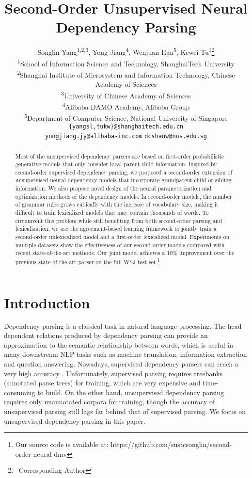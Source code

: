 \documentclass[11pt]{article}
\title{Second-Order Unsupervised Neural Dependency Parsing}
\author{Songlin Yang\textsuperscript{1,2,3}, Yong Jiang\textsuperscript{4}, Wenjuan Han\textsuperscript{5}, Kewei Tu\textsuperscript{1}\thanks{\, 	 Corresponding Author}\\
  \textsuperscript{1}School of Information Science and Technology, ShanghaiTech University \\
  \textsuperscript{2}{Shanghai Institute of Microsystem and Information Technology, Chinese Academy of Sciences}\\
  \textsuperscript{3}{University of Chinese Academy of Sciences}\\
\textsuperscript{4}Alibaba DAMO Academy, Alibaba Group\\
  \textsuperscript{5}Department of Computer Science, National University of Singapore \\
    {\tt \{yangsl,tukw\}@shanghaitech.edu.cn}\\
    {\tt yongjiang.jy@alibaba-inc.com}\qquad
    {\tt dcshanw@nus.edu.sg}\\
 }
\date{}
\begin{document}
\maketitle
\begin{abstract}
Most of the unsupervised dependency parsers are based on first-order probabilistic generative models that only consider local parent-child information. Inspired by second-order supervised dependency parsing, we proposed a second-order extension of unsupervised neural dependency models  that incorporate grandparent-child or sibling information.  We also propose novel design of the neural parameterization and optimization methods of the dependency models. In second-order models, the number of grammar rules grows cubically with the increase of vocabulary size, making it difficult to train lexicalized models that may contain thousands of words. To circumvent this problem while still benefiting from both second-order parsing and lexicalization, we use the agreement-based learning framework to jointly train a second-order unlexicalized model and a first-order lexicalized model.   Experiments on multiple datasets show the effectiveness of our second-order models compared with recent state-of-the-art methods. Our joint model achieves a 10\% improvement over the previous state-of-the-art parser on the full WSJ test set.\footnote{Our source code is available at: https://github.com/sustcsonglin/second-order-neural-dmv}
\end{abstract}


\section{Introduction}
\label{intro}



Dependency parsing is a classical task in natural language processing. The head-dependent relations produced by dependency parsing can provide an approximation to the semantic relationship between words, which is useful in many downstream NLP tasks such as machine translation, information extraction and question answering.  Nowadays, supervised dependency parsers can reach a very high accuracy \cite{DBLP:conf/iclr/DozatM17,DBLP:conf/acl/ZhangLZ20}. Unfortunately, supervised parsing requires treebanks (annotated parse trees) for training, which are very expensive and time-consuming to build. On the other hand, unsupervised dependency parsing requires only unannotated corpora for training, though the accuracy of unsupervised parsing still lags far behind that of supervised parsing.  We focus on unsupervised dependency parsing in this paper. 
\end{document}
